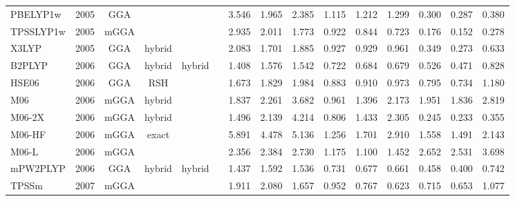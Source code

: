\begin{landscape}
\begin{longtable}{ll:cccc:rrr:rrr:rrr}
    PBELYP1w         & 2005 & GGA  &          &             &           & 3.546             & 1.965             & 2.385  & 1.115              & 1.212             & 1.299  & 0.300   & 0.287 & 0.380 \\
    TPSSLYP1w        & 2005 & mGGA &          &             &           & 2.935             & 2.011             & 1.773  & 0.922              & 0.844             & 0.723  & 0.176   & 0.152 & 0.278 \\
    X3LYP            & 2005 & GGA  & hybrid   &             &           & 2.083             & 1.701             & 1.885  & 0.927              & 0.929             & 0.961  & 0.349   & 0.273 & 0.633 \\
    B2PLYP           & 2006 & GGA  & hybrid   & hybrid      &           & 1.408             & 1.576             & 1.542  & 0.722              & 0.684             & 0.679  & 0.526   & 0.471 & 0.828 \\
    HSE06            & 2006 & GGA  & RSH      &             &           & 1.673             & 1.829             & 1.984  & 0.883              & 0.910             & 0.973  & 0.795   & 0.734 & 1.180 \\
    M06              & 2006 & mGGA & hybrid   &             &           & 1.837             & 2.261             & 3.682  & 0.961              & 1.396             & 2.173  & 1.951   & 1.836 & 2.819 \\
    M06-2X           & 2006 & mGGA & hybrid   &             &           & 1.496             & 2.139             & 4.214  & 0.806              & 1.433             & 2.305  & 0.245   & 0.233 & 0.355 \\
    M06-HF           & 2006 & mGGA & exact    &             &           & 5.891             & 4.478             & 5.136  & 1.256              & 1.701             & 2.910  & 1.558   & 1.491 & 2.143 \\
    M06-L            & 2006 & mGGA &          &             &           & 2.356             & 2.384             & 2.730  & 1.175              & 1.100             & 1.452  & 2.652   & 2.531 & 3.698 \\
    mPW2PLYP         & 2006 & GGA  & hybrid   & hybrid      &           & 1.437             & 1.592             & 1.536  & 0.731              & 0.677             & 0.661  & 0.458   & 0.400 & 0.742 \\
    TPSSm            & 2007 & mGGA &          &             &           & 1.911             & 2.080             & 1.657  & 0.952              & 0.767             & 0.623  & 0.715   & 0.653 & 1.077 \\

\end{longtable}
\end{landscape}
